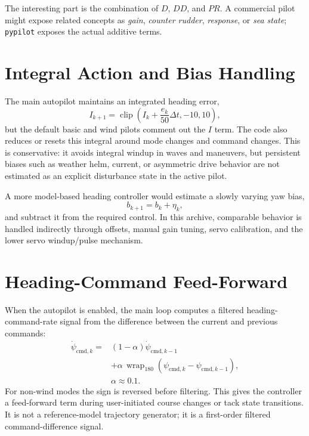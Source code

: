 \documentclass[11pt,twocolumn]{article}
\newcommand{\wrap}{\operatorname{wrap}_{180}}
\newcommand{\clip}{\operatorname{clip}}
\newcommand{\heading}{\psi}
\newcommand{\cmd}{\mathrm{cmd}}
\begin{document}
The interesting part is the combination of \(D\), \(DD\), and \(PR\).  A commercial pilot
might expose related concepts as \emph{gain}, \emph{counter rudder}, \emph{response}, or
\emph{sea state}; \texttt{pypilot} exposes the actual additive terms.

\section{Integral Action and Bias Handling}

The main autopilot maintains an integrated heading error,
\begin{equation}
  I_{k+1} = \clip\!\left(I_k + \frac{e_k}{50}\Delta t, -10, 10\right),
  \label{eq:integral}
\end{equation}
but the default basic and wind pilots comment out the \(I\) term.  The code also reduces
or resets this integral around mode changes and command changes.  This is conservative:
it avoids integral windup in waves and maneuvers, but persistent biases such as weather
helm, current, or asymmetric drive behavior are not estimated as an explicit disturbance
state in the active pilot.

A more model-based heading controller would estimate a slowly varying yaw bias,
\begin{equation}
  b_{k+1} = b_k + \eta_k,
\end{equation}
and subtract it from the required control.  In this archive, comparable behavior is
handled indirectly through offsets, manual gain tuning, servo calibration, and the lower
servo windup/pulse mechanism.

\section{Heading-Command Feed-Forward}

When the autopilot is enabled, the main loop computes a filtered heading-command-rate
signal from the difference between the current and previous commands:
\begin{equation}
\begin{split}
  \dot{\heading}_{\cmd,k} ={}&
  (1-\alpha)\dot{\heading}_{\cmd,k-1} \\
  &+ \alpha\,\wrap(\heading_{\cmd,k}-\heading_{\cmd,k-1}), \\
  &\alpha \approx 0.1.
\end{split}
\end{equation}
For non-wind modes the sign is reversed before filtering.  This gives the controller a
feed-forward term during user-initiated course changes or tack state transitions.  It is
not a reference-model trajectory generator; it is a first-order filtered command-difference
signal.
\end{document}
